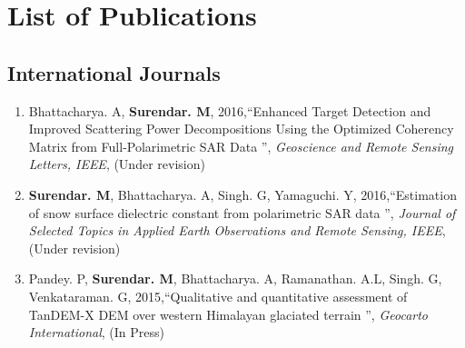 \chapter*{List of Publications}
\label{ch:pub}

   
\section*{International Journals}
\begin{enumerate}
	
	\item Bhattacharya. A, \textbf{Surendar. M}, 2016,\textquotedblleft Enhanced Target Detection and Improved Scattering Power Decompositions Using the Optimized Coherency Matrix from Full-Polarimetric SAR Data \textquotedblright, \textit{Geoscience and Remote Sensing Letters, IEEE}, (Under revision)
	
	\item \textbf{Surendar. M}, Bhattacharya. A, Singh. G,  Yamaguchi. Y, 2016,\textquotedblleft Estimation of snow surface dielectric constant from polarimetric SAR data \textquotedblright, \textit{Journal of Selected Topics in Applied Earth Observations and Remote Sensing, IEEE}, (Under revision)
	
	\item Pandey. P, \textbf{Surendar. M}, Bhattacharya. A, Ramanathan. A.L, Singh. G, Venkataraman. G, 2015,\textquotedblleft Qualitative and quantitative assessment of TanDEM-X DEM over western Himalayan glaciated terrain \textquotedblright, \textit{Geocarto International}, (In Press)
	
	
\end{enumerate}

